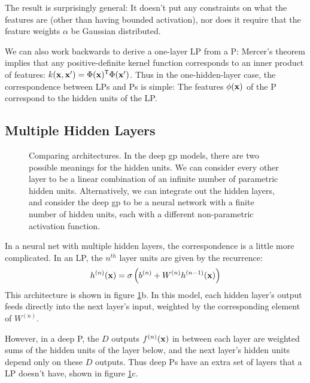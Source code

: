 \documentclass[twoside]{article}
\makeatletter
\newlength{\nonHumbleHeight}
\def\@humbleformat#1{{\settoheight{\nonHumbleHeight}{#1}\resizebox{!}{0.94\nonHumbleHeight}{#1}}}%
\def\humble#1{\@humbleformat{#1}}%
\newcommand{\gp}{{\humble GP}}
\newcommand{\gpt}{{\sc gp}}
\newcommand{\MLP}{{\humble MLP}}
\makeatother
\begin{document}
The result is surprisingly general:  It doesn't put any constraints on what the features are (other than having bounded activation), nor does it require that the feature weights $\alpha$ be Gaussian distributed.  

We can also work backwards to derive a one-layer \MLP{} from a \gp{}:  Mercer's theorem implies that any positive-definite kernel function corresponds to an inner product of features: $k({\bf{x}}, {\bf{x}}') = \Phi({\bf{x}}) {^\mathsf{T}} \Phi({\bf{x}}')$.
%
Thus in the one-hidden-layer case, the correspondence between \MLP{}s and \gp{}s is simple:  The features $\phi({\bf{x}})$ of the \gp{} correspond to the hidden units of the \MLP{}.


\subsection{Multiple Hidden Layers}

\begin{figure}

\caption{Comparing architectures.
In the deep \gpt{} models, there are two possible meanings for the hidden units.  
We can consider every other layer to be a linear combination of an infinite number of parametric hidden units. Alternatively, we can integrate out the hidden layers, and consider the deep \gpt{} to be a neural network with a finite number of hidden units, each with a different non-parametric activation function.}
\label{fig:architectures}
\end{figure}

In a neural net with multiple hidden layers, the correspondence is a little more complicated.  In an \MLP{}, the $n^{th}$ layer units are given by the recurrence:
%
\begin{align}
h^{(n)}({\bf{x}}) = \sigma \left( b^{(n)} + W^{(n)} h^{(n-1)}({\bf{x}}) \right)
\end{align}
%
This architecture is shown in figure \ref{fig:architectures}b.  
%
%
In this model, each hidden layer's output feeds directly into the next layer's input, weighted by the corresponding element of $W^{(n)}$.  

However, in a deep \gp{}, the $D$ outputs $f^{(n)}({\bf{x}})$ in between each layer are weighted sums of the hidden units of the layer below, and the next layer's hidden units depend only on these $D$ outputs.  Thus deep \gp{}s have an extra set of layers that a \MLP{} doesn't have, shown in figure \ref{fig:architectures}c.
\end{document}
